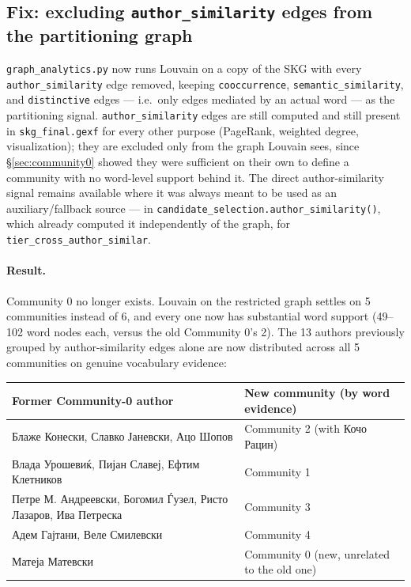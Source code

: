 \documentclass[11pt]{article}
\begin{document}
\subsection{Fix: excluding \texttt{author\_similarity} edges from the
partitioning graph}
\label{sec:community0fix}

\texttt{graph\_analytics.py} now runs Louvain on a copy of the SKG with
every \texttt{author\_similarity} edge removed, keeping
\texttt{cooccurrence}, \texttt{semantic\_similarity}, and
\texttt{distinctive} edges — i.e.\ only edges mediated by an actual word —
as the partitioning signal. \texttt{author\_similarity} edges are still
computed and still present in \texttt{skg\_final.gexf} for every other
purpose (PageRank, weighted degree, visualization); they are excluded only
from the graph Louvain sees, since \S\ref{sec:community0} showed they were
sufficient on their own to define a community with no word-level support
behind it. The direct author-similarity signal remains available where it
was always meant to be used as an auxiliary/fallback source — in
\texttt{candidate\_selection.author\_similarity()}, which already computed
it independently of the graph, for \texttt{tier\_cross\_author\_similar}.

\paragraph{Result.} Community 0 no longer exists. Louvain on the restricted
graph settles on 5 communities instead of 6, and every one now has
substantial word support (49--102 word nodes each, versus the old Community
0's 2). The 13 authors previously grouped by author-similarity edges alone
are now distributed across all 5 communities on genuine vocabulary evidence:

\begin{center}
\small
\begin{tabular}{ll}
\toprule
Former Community-0 author & New community (by word evidence) \\
\midrule
Блаже Конески, Славко Јаневски, Ацо Шопов & Community 2 (with Кочо Рацин) \\
Влада Урошевиќ, Пијан Славеј, Ефтим Клетников & Community 1 \\
Петре М. Андреевски, Богомил Ѓузел, Ристо Лазаров, Ива Петреска & Community 3 \\
Адем Гајтани, Веле Смилевски & Community 4 \\
Матеја Матевски & Community 0 (new, unrelated to the old one) \\
\bottomrule
\end{tabular}
\end{center}
\end{document}
